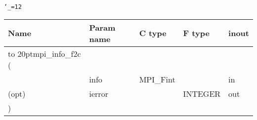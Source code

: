 \begingroup\tt\catcode`\_=12
\begin{tabular}{lllll}
\toprule
\textrm{Name}&\textrm{Param name}&\textrm{C type}&\textrm{F type}&\textrm{inout}\\
\midrule
\hbox to 20pt{mpi_info_f2c (\hss} \\
&info&MPI_Fint&&in\\
(opt)&ierror&&INTEGER&out\\
)\\
\bottomrule
\end{tabular}
\endgroup

